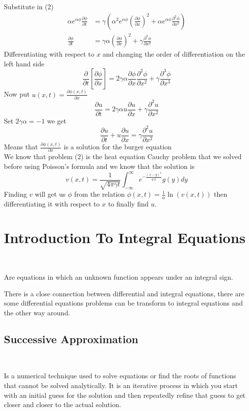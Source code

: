 Substitute in (2)
\begin{align}
\alpha e^{\alpha\phi} \frac{\partial \phi}{\partial t} &= \gamma\left(\alpha^2 e^{\alpha \phi} {\left(\frac{\partial \phi}{\partial x}\right)}^2 + \alpha e^{\alpha\phi} \frac{\partial^2 \phi}{\partial x^2}\right)\nonumber
\\
\frac{\partial \phi}{\partial t} &= \gamma\alpha {\left(\frac{\partial \phi}{\partial x}\right)}^2 + \gamma \frac{\partial^2 \phi}{\partial x^2}
\end{align}
Differentiating with respect to $x$ and changing the order of differentiation on the left hand side
\[
    \frac{\partial }{\partial t}\left[ \frac{\partial \phi}{\partial x}\right] = 2\gamma\alpha \frac{\partial\phi}{\partial x}\frac{\partial^2 \phi }{\partial x^2} + \gamma\frac{\partial^3 \phi}{\partial x^3}    
\]
Now put $\displaystyle u(x,t) = \frac{\partial \phi(x,t)}{\partial x}$
\[
    \frac{\partial u }{\partial t} = 2\gamma\alpha u\frac{\partial u}{\partial x} + \gamma\frac{\partial^2 u}{\partial x^2}    
\]
Set $2\gamma\alpha = -1$ we get
\[
    \frac{\partial u }{\partial t} + u\frac{\partial u}{\partial x} = \gamma\frac{\partial^2 u}{\partial x^2}    
\]
Means that $\displaystyle \frac{\partial \phi(x,t)}{\partial x}$ is a solution for the burger equation 
\\
We know that problem (2) is the heat equation Cauchy problem that we solved before using Poisson's formula and we know that the solution is 
\[
v(x,t) = \frac{1}{\sqrt{4\pi \gamma t}} \int_{-\infty}^{\infty} e^{\textstyle -\frac{(x-y)^2}{4\gamma t}} g(y)dy    
\]
Finding $v$ will get us $\phi$ from the relation $\displaystyle \phi(x,t) = \frac{1}{\alpha}\ln(v(x,t))$ then differentiating it with respect to $x$ to finally find $u$.

\section{Introduction To Integral Equations}
\
\begin{definition}
    Are equations in which an unknown function appears under an integral sign.
\end{definition}
There is a close connection between differential and integral equations, 
there are some differential equations problems can be transform to integral equations and the other way around.

\subsection{Successive Approximation}
\
\begin{definition}
    Is a numerical technique used to solve equations or find the roots of functions that cannot be solved analytically. It is an iterative process in which you start with an initial guess for the solution and then repeatedly refine that guess to get closer and closer to the actual solution.
\end{definition}

